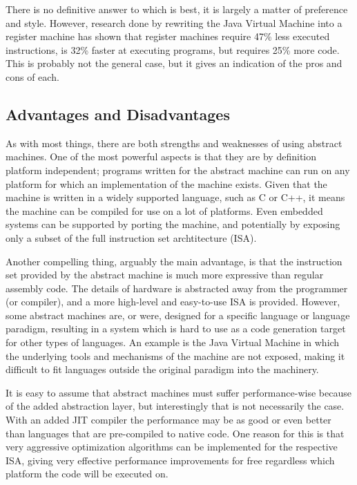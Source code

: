 There is no definitive answer to which is best, it is largely a matter of
preference and style. However, research done by rewriting the Java Virtual
Machine into a register machine has shown that register machines require 47\%
less executed instructions, is 32\% faster at executing programs, but requires
25\% more code\cite{shi05}. This is probably not the general case, but it gives
an indication of the pros and cons of each.

\subsection{Advantages and Disadvantages}

As with most things, there are both strengths and weaknesses of using abstract
machines. One of the most powerful aspects is that they are by definition
platform independent; programs written for the abstract machine can run on any
platform for which an implementation of the machine exists. Given that the
machine is written in a widely supported language, such as C or C++, it means
the machine can be compiled for use on a lot of platforms. Even embedded systems
can be supported by porting the machine, and potentially by exposing only a
subset of the full instruction set archtitecture (ISA).

Another compelling thing, arguably the main advantage, is that the instruction
set provided by the abstract machine is much more expressive than regular
assembly code. The details of hardware is abstracted away from the programmer
(or compiler), and a more high-level and easy-to-use ISA is provided. However,
some abstract machines are, or were, designed for a specific language or
language paradigm, resulting in a system which is hard to use as a code
generation target for other types of languages. An example is the Java Virtual
Machine in which the underlying tools and mechanisms of the machine are not
exposed, making it difficult to fit languages outside the original paradigm into
the machinery.

It is easy to assume that abstract machines must suffer performance-wise because
of the added abstraction layer, but interestingly that is not necessarily the
case. With an added JIT compiler the performance may be as good or even better
than languages that are pre-compiled to native code\cite{mangione98,
  qwertie11}. One reason for this is that very aggressive optimization
algorithms can be implemented for the respective ISA, giving very effective
performance improvements for free regardless which platform the code will be
executed on.

